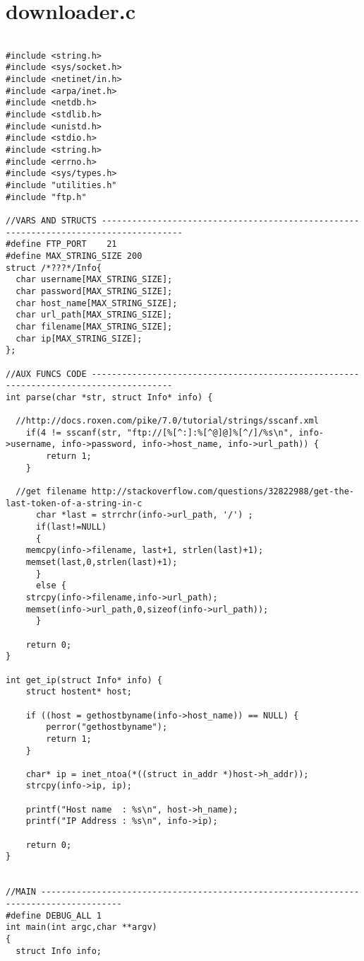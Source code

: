\section{downloader.c}
\label{DOWNLOADERC}

\begin{lstlisting}

#include <string.h>
#include <sys/socket.h>
#include <netinet/in.h>
#include <arpa/inet.h>
#include <netdb.h>
#include <stdlib.h>
#include <unistd.h>
#include <stdio.h>
#include <string.h>
#include <errno.h> 
#include <sys/types.h>
#include "utilities.h"
#include "ftp.h"

//VARS AND STRUCTS --------------------------------------------------------------------------------------
#define FTP_PORT	21
#define MAX_STRING_SIZE 200
struct /*???*/Info{
  char username[MAX_STRING_SIZE];
  char password[MAX_STRING_SIZE];
  char host_name[MAX_STRING_SIZE];
  char url_path[MAX_STRING_SIZE];
  char filename[MAX_STRING_SIZE];
  char ip[MAX_STRING_SIZE];
};

//AUX FUNCS CODE --------------------------------------------------------------------------------------
int parse(char *str, struct Info* info) {
  
  //http://docs.roxen.com/pike/7.0/tutorial/strings/sscanf.xml
	if(4 != sscanf(str, "ftp://[%[^:]:%[^@]@]%[^/]/%s\n", info->username, info->password, info->host_name, info->url_path)) {
		return 1;
	}

  //get filename http://stackoverflow.com/questions/32822988/get-the-last-token-of-a-string-in-c
      char *last = strrchr(info->url_path, '/') ;
      if(last!=NULL) 
      {
	memcpy(info->filename, last+1, strlen(last)+1);
	memset(last,0,strlen(last)+1);
      }
      else {
	strcpy(info->filename,info->url_path);
	memset(info->url_path,0,sizeof(info->url_path));
      }
  
	return 0;
}

int get_ip(struct Info* info) {
	struct hostent* host;

	if ((host = gethostbyname(info->host_name)) == NULL) {
		perror("gethostbyname");
		return 1;
	}

	char* ip = inet_ntoa(*((struct in_addr *)host->h_addr));
	strcpy(info->ip, ip);

	printf("Host name  : %s\n", host->h_name);
	printf("IP Address : %s\n", info->ip);
	
	return 0;
}


//MAIN --------------------------------------------------------------------------------------
#define DEBUG_ALL 1
int main(int argc,char **argv)
{
  struct Info info;
  

\end{lstlisting}
